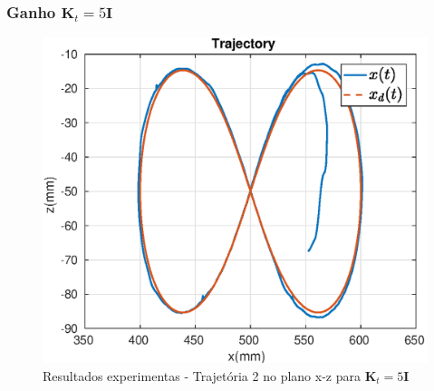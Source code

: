 \subsubsection{Ganho $\bm{K}_t = 5\bm{I}$}

\begin{figure}[H]
\centering
  \includegraphics[width=0.5\linewidth]{./img/traj_2_k5/traj.eps}
  \caption{Resultados experimentas - Trajetória 2 no plano x-z para $\bm{K}_t = 5\bm{I}$}
  \label{fig:sub1}
\end{figure}%

